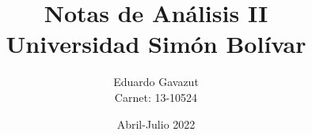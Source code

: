\documentclass{tufte-handout}
\title{
Notas de Análisis II \\
Universidad Simón Bolívar
}
\author{
Eduardo Gavazut \\
Carnet: 13-10524}
\date{Abril-Julio 2022}
\theoremstyle{plain}
\theoremstyle{definition}
\begin{document}
\maketitle
\thispagestyle{fancy}

\tableofcontents
\break


















\renewcommand\refname{Referencias}


\end{document}
